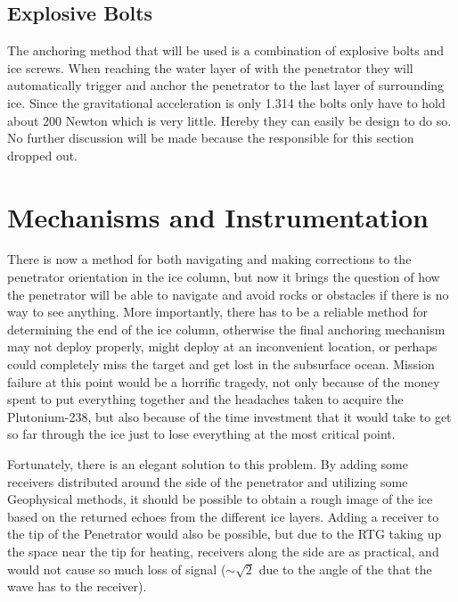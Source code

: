 

\subsection{Explosive Bolts}
The anchoring method that will be used is a combination of explosive bolts and ice screws. When reaching the water layer of with the penetrator they will automatically trigger and anchor the penetrator to the last layer of surrounding ice. Since the gravitational acceleration is only 1.314 the bolts only have to hold about 200 Newton which is very little. Hereby they can easily be design to do so. No further discussion will be made because the responsible for this section dropped out.

\section{Mechanisms and Instrumentation}



There is now a method for both navigating and making corrections to the penetrator orientation in the ice column, but now it brings the question of how the penetrator will be able to navigate and avoid rocks or obstacles if there is no way to see anything. More importantly, there has to be a reliable method for determining the end of the ice column, otherwise the final anchoring mechanism may not deploy properly, might deploy at an inconvenient location, or perhaps could completely miss the target and get lost in the subsurface ocean. Mission failure at this point would be a horrific tragedy, not only because of the money spent to put everything together and the headaches taken to acquire the Plutonium-238, but also because of the time investment that it would take to get so far through the ice just to lose everything at the most critical point.

Fortunately, there is an elegant solution to this problem. By adding some receivers distributed around the side of the penetrator and utilizing some Geophysical methods, it should be possible to obtain a rough image of the ice based on the returned echoes from the different ice layers. Adding a receiver to the tip of the Penetrator would also be possible, but due to the RTG taking up the space near the tip for heating, receivers along the side are as practical, and would not cause so much loss of signal ($\sim \sqrt{2}$ due to the angle of the that the wave has to the receiver).

